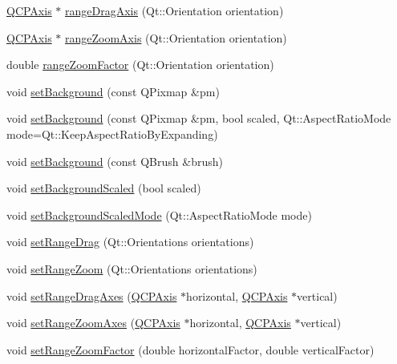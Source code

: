 \begin{DoxyCompactItemize}
\item 
\hyperlink{classQCPAxis}{\-Q\-C\-P\-Axis} $\ast$ \hyperlink{classQCPAxisRect_a6d7c22cfc54fac7a3d6ef80b133a8574}{range\-Drag\-Axis} (\-Qt\-::\-Orientation orientation)
\item 
\hyperlink{classQCPAxis}{\-Q\-C\-P\-Axis} $\ast$ \hyperlink{classQCPAxisRect_a679c63f2b8daccfe6ec5110dce3dd3b6}{range\-Zoom\-Axis} (\-Qt\-::\-Orientation orientation)
\item 
double \hyperlink{classQCPAxisRect_ae4e6c4d143aacc88d2d3c56f117c2fe1}{range\-Zoom\-Factor} (\-Qt\-::\-Orientation orientation)
\item 
void \hyperlink{classQCPAxisRect_af615ab5e52b8e0a9a0eff415b6559db5}{set\-Background} (const \-Q\-Pixmap \&pm)
\item 
void \hyperlink{classQCPAxisRect_ac48a2d5d9b7732e73b86605c69c5e4c1}{set\-Background} (const \-Q\-Pixmap \&pm, bool scaled, \-Qt\-::\-Aspect\-Ratio\-Mode mode=\-Qt\-::\-Keep\-Aspect\-Ratio\-By\-Expanding)
\item 
void \hyperlink{classQCPAxisRect_a22a22b8668735438dc06f9a55fe46b33}{set\-Background} (const \-Q\-Brush \&brush)
\item 
void \hyperlink{classQCPAxisRect_ae6d36c3e0e968ffb991170a018e7b503}{set\-Background\-Scaled} (bool scaled)
\item 
void \hyperlink{classQCPAxisRect_a5ef77ea829c9de7ba248e473f48f7305}{set\-Background\-Scaled\-Mode} (\-Qt\-::\-Aspect\-Ratio\-Mode mode)
\item 
void \hyperlink{classQCPAxisRect_ae6aef2f7211ba6097c925dcd26008418}{set\-Range\-Drag} (\-Qt\-::\-Orientations orientations)
\item 
void \hyperlink{classQCPAxisRect_a7960a9d222f1c31d558b064b60f86a31}{set\-Range\-Zoom} (\-Qt\-::\-Orientations orientations)
\item 
void \hyperlink{classQCPAxisRect_a648cce336bd99daac4a5ca3e5743775d}{set\-Range\-Drag\-Axes} (\hyperlink{classQCPAxis}{\-Q\-C\-P\-Axis} $\ast$horizontal, \hyperlink{classQCPAxis}{\-Q\-C\-P\-Axis} $\ast$vertical)
\item 
void \hyperlink{classQCPAxisRect_a9442cca2aa358405f39a64d51eca13d2}{set\-Range\-Zoom\-Axes} (\hyperlink{classQCPAxis}{\-Q\-C\-P\-Axis} $\ast$horizontal, \hyperlink{classQCPAxis}{\-Q\-C\-P\-Axis} $\ast$vertical)
\item 
void \hyperlink{classQCPAxisRect_a895d7ac745ea614e04056244b3c138ac}{set\-Range\-Zoom\-Factor} (double horizontal\-Factor, double vertical\-Factor)
\item 

\end{DoxyCompactItemize}
